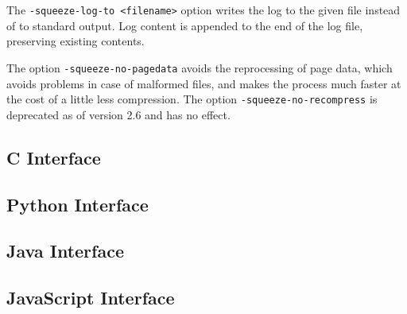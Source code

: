 \documentclass{book}
\begin{document}
\noindent The \texttt{-squeeze-log-to <filename>} option writes the log to the given file instead of to standard output. Log content is appended to the end of the log file, preserving existing contents.

The option \texttt{-squeeze-no-pagedata} avoids the reprocessing of page data, which avoids problems in case of malformed files, and makes the process much faster at the cost of a little less compression. The option \texttt{-squeeze-no-recompress} is deprecated as of version 2.6 and has no effect.

\begin{cpdflib}
\clearpage
\section*{C Interface}
\begin{small}\tt

\end{small}
\end{cpdflib}

\begin{pycpdflib}
\clearpage
\section*{Python Interface}
\begin{small}\tt

\end{small}
\end{pycpdflib}

\begin{jcpdflib}
\clearpage
\section*{Java Interface}
\begin{small}\tt

\end{small}
\end{jcpdflib}

\begin{jscpdflib}
\clearpage
\section*{JavaScript Interface}
\begin{small}\tt

\end{small}
\end{jscpdflib}
\end{document}
